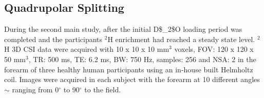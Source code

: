 

\subsection{Quadrupolar Splitting}

During the second main study, after the initial \ac{D$_2$O} loading period was completed and the participants $^2$H enrichment had reached a steady state level. $^2$H 3D \ac{CSI} data were acquired with 10 x 10 x 10 mm$^3$ voxels, \ac{FOV}: 120 x 120 x 50 mm$^3$, \ac{TR}: 500 ms, \ac{TE}: 6.2 ms, \ac{BW}: 750 Hz, samples: 256 and NSA: 2 in the forearm of three healthy human participants using an in-house built Helmholtz coil. Images were acquired in each subject with the forearm at 10 different angles $\sim$ ranging from 0$^\circ$ to 90$^\circ$ to the field. 

